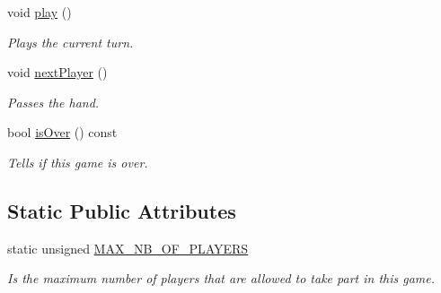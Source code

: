 \begin{DoxyCompactItemize}
void \mbox{\hyperlink{classlabyrinth_1_1_game_a44715f5e2e8f893787a78c0aa9d92868}{play}} ()
\begin{DoxyCompactList}\small\item\em Plays the current turn. \end{DoxyCompactList}\item 
\mbox{\label{classlabyrinth_1_1_game_a11f47ba46e8ea6635ecc4020fdabe19c}} 
void \mbox{\hyperlink{classlabyrinth_1_1_game_a11f47ba46e8ea6635ecc4020fdabe19c}{next\+Player}} ()
\begin{DoxyCompactList}\small\item\em Passes the hand. \end{DoxyCompactList}\item 
bool \mbox{\hyperlink{classlabyrinth_1_1_game_a33b108f397247235704d0cab30e59bfd}{is\+Over}} () const
\begin{DoxyCompactList}\small\item\em Tells if this game is over. \end{DoxyCompactList}\end{DoxyCompactItemize}
\subsection*{Static Public Attributes}
\begin{DoxyCompactItemize}
\item 
\mbox{\label{classlabyrinth_1_1_game_ab9f172b0ca2a0332163b7dbdbb45775a}} 
static unsigned \mbox{\hyperlink{classlabyrinth_1_1_game_ab9f172b0ca2a0332163b7dbdbb45775a}{M\+A\+X\+\_\+\+N\+B\+\_\+\+O\+F\+\_\+\+P\+L\+A\+Y\+E\+RS}}
\begin{DoxyCompactList}\small\item\em Is the maximum number of players that are allowed to take part in this game. \end{DoxyCompactList}\end{DoxyCompactItemize}
